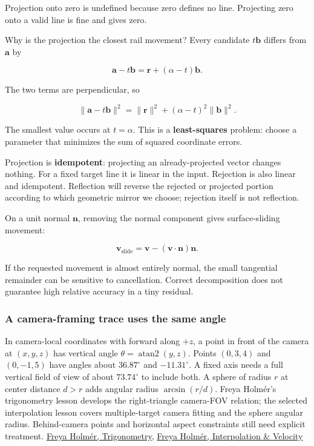 Projection onto zero is undefined because zero defines no line. Projecting zero onto a valid line is fine and gives zero.

Why is the projection the closest rail movement? Every candidate \(t\mathbf b\) differs from \(\mathbf a\) by

\[
\mathbf a-t\mathbf b=\mathbf r+(\alpha-t)\mathbf b.
\]

The two terms are perpendicular, so

\[
\|\mathbf a-t\mathbf b\|^2
=\|\mathbf r\|^2+(\alpha-t)^2\|\mathbf b\|^2.
\]

The smallest value occurs at \(t=\alpha\). This is a \textbf{least-squares} problem: choose a parameter that minimizes the sum of squared coordinate errors.

Projection is \textbf{idempotent}: projecting an already-projected vector changes nothing. For a fixed target line it is linear in the input. Rejection is also linear and idempotent. Reflection will reverse the rejected or projected portion according to which geometric mirror we choose; rejection itself is not reflection.

On a unit normal \(\mathbf n\), removing the normal component gives surface-sliding movement:

\[
\mathbf v_{\mathrm{slide}}=\mathbf v-(\mathbf v\cdot\mathbf n)\mathbf n.
\]

If the requested movement is almost entirely normal, the small tangential remainder can be sensitive to cancellation. Correct decomposition does not guarantee high relative accuracy in a tiny residual.

\subsubsection{A camera-framing trace uses the same angle}\label{01-foundations-i-ch017-a-camera-framing-trace-uses-the-same-angle}

\hypertarget{01-foundations-i-ch017-a-camera-framing-trace-uses-the-same-angle}{}

In camera-local coordinates with forward along \(+z\), a point in front of the camera at \((x,y,z)\) has vertical angle \(\theta=\operatorname{atan2}(y,z)\). Points \((0,3,4)\) and \((0,-1,5)\) have angles about \(36.87^\circ\) and \(-11.31^\circ\). A fixed axis needs a full vertical field of view of about \(73.74^\circ\) to include both. A sphere of radius \(r\) at center distance \(d>r\) adds angular radius \(\arcsin(r/d)\). Freya Holmér's trigonometry lesson develops the right-triangle camera-FOV relation; the selected interpolation lesson covers multiple-target camera fitting and the sphere angular radius. Behind-camera points and horizontal aspect constraints still need explicit treatment. \href{https://www.youtube.com/watch?v=1NLekEd770w}{Freya Holmér, Trigonometry}, \href{https://www.youtube.com/watch?v=-Ii3MrJFBkQ}{Freya Holmér, Interpolation \& Velocity}

